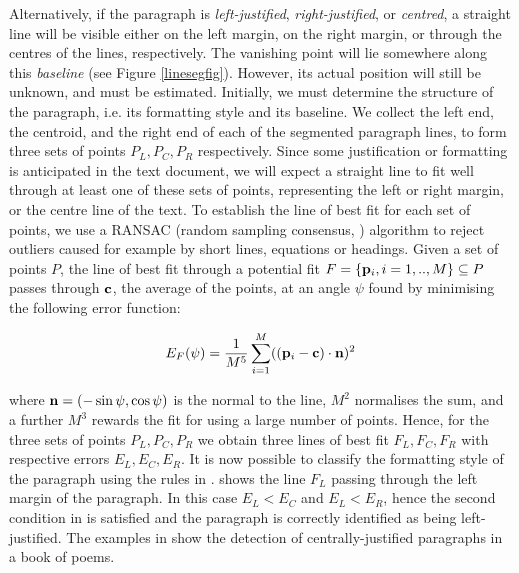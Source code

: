 Alternatively, if the paragraph is {\em left-justified}, {\em right-justified},
or {\em centred}, a straight line will be visible either on the left margin, on
the right margin, or through the centres of the lines, respectively.  The
vanishing point will lie somewhere along this {\em baseline} (see Figure \ref{linesegfig}).  However, its actual
position will still be unknown, and must be estimated.  Initially, we must
determine the structure of the paragraph, i.e. its formatting style and its baseline. We collect
the left end, the centroid, and the right end of each of the segmented paragraph lines, to
form three sets of points $P_L,P_C,P_R$ respectively.  Since some justification
or formatting is anticipated in the text document, 
we will expect a straight line to
fit well through at least one of these sets of points, representing the left or
right margin, or the centre line of the text.  To establish the line of
best fit for each set of points, we use a RANSAC (random sampling consensus,
\cite{bolles81ransac-based}) algorithm to reject outliers caused for example by
short lines, equations or headings.  Given a set of points $P$, the line of best
fit through a potential fit $F=\{{ \bf p }_i, i=1,..,M\}\subseteq P$ passes
through ${ \bf c }$, the average of the points, at an angle $\psi$ found by
minimising the following error function:

\begin{equation}
E_F(\psi) = \frac{1}{M^5} \sum_{i=1}^{M} ( ({ \bf p }_i-{ \bf c }) \cdot { \bf n })^2
\label{ransacerroreqn}
\end{equation}

{\parindent 0mm
where ${ \bf n }=(-\sin \psi,\cos \psi)$ is the normal to the line, $M^{2}$
normalises the sum, and a further $M^{3}$ rewards the fit for using a large
number of points. Hence, for the three sets of points $P_L,P_C,P_R$ we obtain
three lines of best fit $F_L,F_C,F_R$ with respective errors
$E_L,E_C,E_R$.  It is now possible to classify the formatting style of the
paragraph using the rules in .
 shows the line $F_L$ passing through the left margin of
the paragraph.  In this case $E_L<E_C$ and $E_L<E_R$, hence the second
condition in  is satisfied and the paragraph is
correctly identified as being left-justified. The examples in 
 show the detection of centrally-justified paragraphs
in a book of poems.
}

